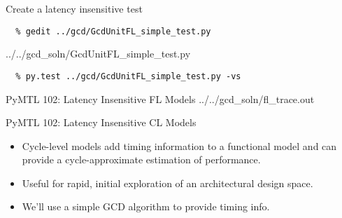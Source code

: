 \begin{task}\begin{frame}[fragile]{Create a latency insensitive test}

\vspace{-0.15in}
\begin{Verbatim}[commandchars=\\\{\}]
  % cd \midtilde/pymtl-tut/build
  % gedit ../gcd/GcdUnitFL_simple_test.py
\end{Verbatim}
\vspace{-0.2in}

%
{../../gcd_soln/GcdUnitFL_simple_test.py}

\vspace{-0.22in}
\begin{verbatim}
  % py.test ../gcd/GcdUnitFL_simple_test.py -vs
\end{verbatim}
\end{frame}
\end{task}

\begin{frame}{PyMTL 102: Latency Insensitive FL Models}
\vspace{-0.25in}
%
{../../gcd_soln/fl_trace.out}

\end{frame}

\begin{frame}{PyMTL 102: Latency Insensitive CL Models}

\vspace{-0.1in}
\begin{itemize}
  \item Cycle-level models add timing information to a functional model
        and can provide a cycle-approximate estimation of performance.
  \smallskip
  \item Useful for rapid, initial exploration of an
        architectural design space.
  \smallskip
  \item We'll use a simple GCD algorithm to provide timing info.
\end{itemize}

\end{frame}


